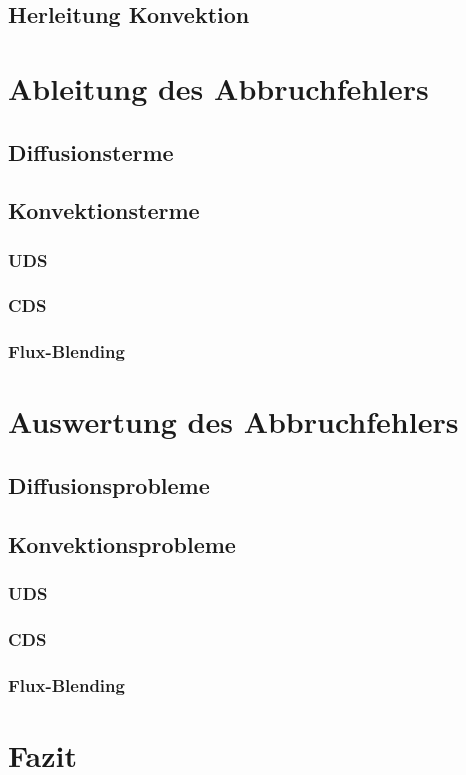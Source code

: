 \documentclass[bigchapter,twoside,report,11pt,type=bsc,colorback,accentcolor=tud2c]{tudthesis}
\begin{document}
  \section{Herleitung Konvektion}


  \chapter{Ableitung des Abbruchfehlers}
  
  \section{Diffusionsterme}
  \section{Konvektionsterme}
  \subsection{UDS}
  \subsection{CDS}
  \subsection{Flux-Blending}

  \chapter{Auswertung des Abbruchfehlers}
  \section{Diffusionsprobleme}
  \section{Konvektionsprobleme}
  \subsection{UDS}
  \subsection{CDS}
  \subsection{Flux-Blending}

  \chapter{Fazit}

  \cleardoublepage




\nocite{*}
\end{document}
